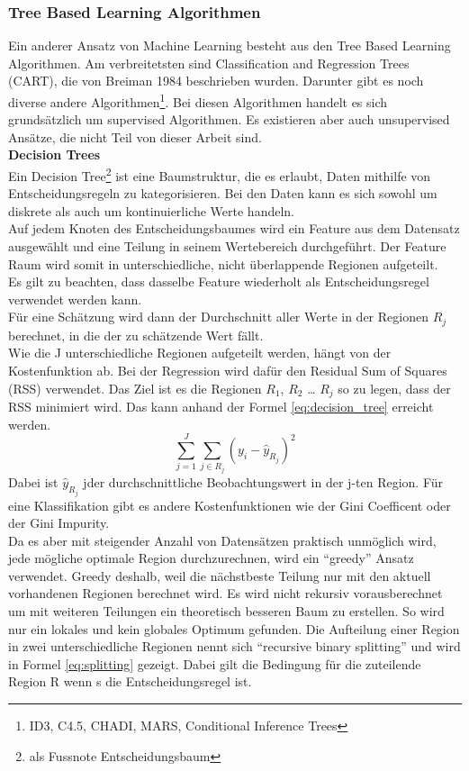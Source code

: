 \subsubsection{Tree Based Learning Algorithmen}
Ein anderer Ansatz von Machine Learning besteht aus den Tree Based Learning Algorithmen. Am verbreitetsten sind Classification and Regression Trees (CART), die von Breiman 1984 beschrieben wurden. Darunter gibt es noch diverse andere Algorithmen\footnote{ID3, C4.5, CHADI, MARS, Conditional Inference Trees}. Bei diesen Algorithmen handelt es sich grundsätzlich um supervised Algorithmen. Es existieren aber auch unsupervised Ansätze, die nicht Teil von dieser Arbeit sind.\\[2ex]
%
\textbf{Decision Trees}\\
Ein Decision Tree\footnote{als Fussnote Entscheidungsbaum} ist eine Baumstruktur, die es erlaubt, Daten mithilfe von Entscheidungsregeln zu kategorisieren. Bei den Daten kann es sich sowohl um diskrete als auch um kontinuierliche Werte handeln.\\
Auf jedem Knoten des Entscheidungsbaumes wird ein Feature aus dem Datensatz ausgewählt und eine Teilung in seinem Wertebereich durchgeführt. Der Feature Raum wird somit in unterschiedliche, nicht überlappende Regionen aufgeteilt.\\[2ex]
Es gilt zu beachten, dass dasselbe Feature wiederholt als Entscheidungsregel verwendet werden kann.\\
Für eine Schätzung wird dann der Durchschnitt aller Werte in der Regionen $R_j$ berechnet, in die der zu schätzende Wert fällt.\\
Wie die  J unterschiedliche Regionen aufgeteilt werden, hängt von der Kostenfunktion ab. Bei der Regression wird dafür den Residual Sum of Squares (RSS) verwendet. Das Ziel ist es die Regionen $R_1$, $R_2$ … $R_j$ so zu legen, dass der RSS minimiert wird. Das kann anhand der Formel \eqref{eq:decision_tree} erreicht werden.
\begin{equation}
\label{eq:decision_tree}
\sum_{j=1}^{J} \sum_{j \in R_j}^{} (y_i - \hat{y}_{R_j})^2
\end{equation}
%
\newline
Dabei ist $\hat{y}_{R_j}$ jder durchschnittliche Beobachtungswert in der j-ten Region.
Für eine Klassifikation gibt es andere Kostenfunktionen wie der Gini Coefficent oder der Gini Impurity.\\
Da es aber mit steigender Anzahl von Datensätzen praktisch unmöglich wird, jede mögliche optimale Region durchzurechnen, wird ein “greedy” Ansatz verwendet. Greedy deshalb, weil die nächstbeste Teilung nur mit den aktuell vorhandenen Regionen berechnet wird. Es wird nicht rekursiv vorausberechnet um mit weiteren Teilungen ein theoretisch besseren Baum zu erstellen. So wird nur ein lokales und kein globales Optimum gefunden. Die Aufteilung einer Region in zwei unterschiedliche Regionen nennt sich “recursive binary splitting” und wird in Formel \eqref{eq:splitting} gezeigt. Dabei gilt die Bedingung für die zuteilende Region R wenn s die Entscheidungsregel ist. 
